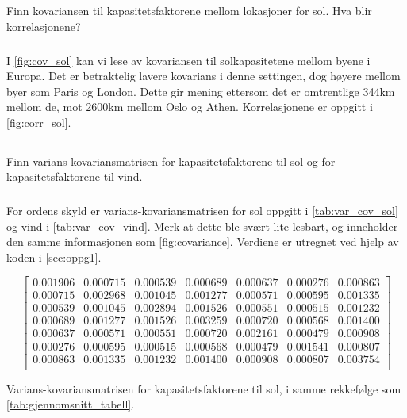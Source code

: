 \documentclass{article}
\begin{document}
\subsection{}
Finn kovariansen til kapasitetsfaktorene mellom lokasjoner for sol. Hva blir korrelasjonene?

\subsubsection{}
I \autoref{fig:cov_sol} kan vi lese av kovariansen til solkapasitetene mellom byene i Europa.
Det er betraktelig lavere kovarians i denne settingen, dog høyere mellom byer som Paris og London.
Dette gir mening ettersom det er omtrentlige 344km mellom de, mot 2600km mellom Oslo og Athen.
Korrelasjonene er oppgitt i \autoref{fig:corr_sol}.

\subsection{}
Finn varians-kovariansmatrisen for kapasitetsfaktorene til sol og for kapasitetsfaktorene til vind.

\subsubsection{}
For ordens skyld er varians-kovariansmatrisen for sol oppgitt i \autoref{tab:var_cov_sol} og vind i \autoref{tab:var_cov_vind}. Merk at dette ble svært lite lesbart, og inneholder den samme informasjonen som \autoref{fig:covariance}. Verdiene er utregnet ved hjelp av koden i \autoref{sec:oppg1}.

\begin{table}[h]
\centering
$$
\begin{bmatrix}
0.001906 & 0.000715 & 0.000539 & 0.000689 & 0.000637 & 0.000276 & 0.000863 \\
0.000715 & 0.002968 & 0.001045 & 0.001277 & 0.000571 & 0.000595 & 0.001335 \\
0.000539 & 0.001045 & 0.002894 & 0.001526 & 0.000551 & 0.000515 & 0.001232 \\
0.000689 & 0.001277 & 0.001526 & 0.003259 & 0.000720 & 0.000568 & 0.001400 \\
0.000637 & 0.000571 & 0.000551 & 0.000720 & 0.002161 & 0.000479 & 0.000908 \\
0.000276 & 0.000595 & 0.000515 & 0.000568 & 0.000479 & 0.001541 & 0.000807 \\
0.000863 & 0.001335 & 0.001232 & 0.001400 & 0.000908 & 0.000807 & 0.003754 \\
\end{bmatrix}
$$
\caption{Varians-kovariansmatrisen for kapasitetsfaktorene til sol, i samme rekkefølge som \autoref{tab:gjennomsnitt_tabell}.}
\label{tab:var_cov_sol}
\end{table}
\end{document}
